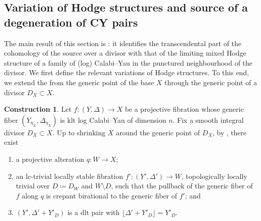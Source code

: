 \documentclass{amsart}
\theoremstyle{definition}
\newtheorem{const}[theorem]{Construction}
\theoremstyle{remark}
\numberwithin{equation}{section}
\begin{document}
\subsection{Variation of Hodge structures and source of a degeneration of CY pairs}\label{sec:variation} The main result of this section is : it identifies the transcendental part of the cohomology of the source over a divisor with that of the limiting mixed Hodge structure of a family of (log) Calabi--Yau in the punctured neighbourhood of the divisor. We first define the relevant variations of Hodge structures. To this end, we extend the  from the generic point of the base $X$ through the generic point of a divisor $D_X \subset X$. 


\begin{const}\label{const:modulioverdivisor}
Let $f \colon (Y, \Delta) \to X$ be a projective fibration 
whose generic fiber $(Y_{\eta_X}, \Delta_{\eta_X})$ is klt
log Calabi--Yau of dimension $n$. Fix a smooth integral divisor $D_X \subset X$. 
Up to shrinking $X$ around the generic point of $D_X$,
by , there exist
\begin{enumerate}
\item a projective alteration $q \colon W \to X$;
\item an lc-trivial locally stable fibration $f' \colon (Y', \Delta') \to W$, topologically locally trivial over $D \coloneqq D_W$ and $W \setminus D$, such that the pullback of the generic fiber of $f$ along $q$ is crepant birational to the generic fiber of $f'$; and
\item $(Y', \Delta' + Y'_{D})$ is a dlt pair with $\lfloor \Delta' + Y'_{D} \rfloor =Y'_{D}$.
\end{enumerate}


\end{const}
\end{document}
